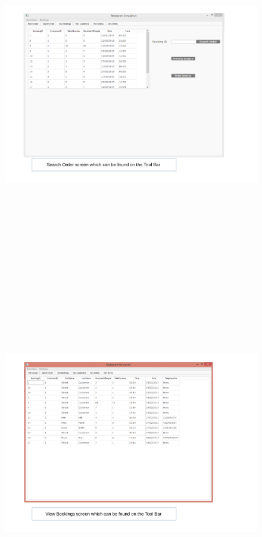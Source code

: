 \begin{landscape}
\begin{figure}[H]
    \includegraphics[height = 15cm]{./Maintenance/images/screen17}
    \caption{} \label{fig:screen17}
\end{figure}

\begin{figure}[H]
    \includegraphics[height = 15cm]{./Maintenance/images/screen18}
    \caption{} \label{fig:screen18}
\end{figure}


\end{landscape}
